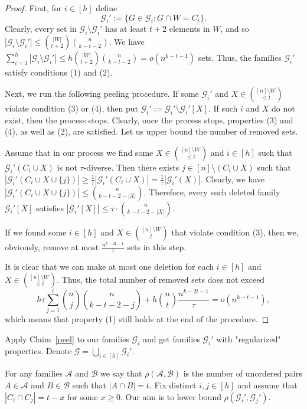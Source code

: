 \documentclass[12pt,a4paper]{article}
\newcommand{\cG}{\mathcal{G}}
\newcommand{\cA}{\mathcal{A}}
\newcommand{\bb}{\mathcal{B}}
\begin{document}
\begin{proof}
First, for $i \in [h]$ define
$$\mathcal{G}_i' := \{G \in \mathcal{G}_i: G \cap W = C_i\}.$$
Clearly, every set in $\mathcal{G}_i \setminus \mathcal{G}_i'$ has at least $t+2$ elements in $W$, and so $|\cG_i \setminus \cG_i'| \leqslant  \binom{|W|}{t+2}\binom{n}{k-t-2}.$ We have $ \sum_{i=1}^h   |\cG_i \setminus \cG_i'| \leqslant   h\binom{|W|}{t+2}\binom{n}{k-t-2}=o(n^{k-t-1})$ sets. Thus, the families $\mathcal{G}_i'$ satisfy conditions (1) and (2). 

Next, we run the following peeling procedure. If some $\cG_i'$ and $X \in \binom{[n] \setminus W}{\leq t}$ violate condition (3) or (4), then put $\cG_i' := \cG_i' \setminus \cG_i'[X]$. If such $i$ and $X$ do not exist, then the process stops. Clearly, once the process stops, properties (3) and (4), as well as (2), are satisfied. Let us upper bound the number of removed sets.

Assume that in our process we find some $X \in \binom{[n] \setminus W}{\leq t}$ and $i \in [h]$ such that $\mathcal{G}_i'(C_i \cup X)$ is not $\tau$-diverse. Then there exists $j \in [n] \setminus (C_i \cup X)$ such that $|\mathcal{G}_i'(C_i \cup X \cup \{j\})| \geqslant \frac{1}{\tau} |\mathcal{G}_i'(C_i \cup X)| = \frac{1}{\tau} |\mathcal{G}_i'(X)|.$ Clearly, we have $|\mathcal{G}_i'(C_i \cup X \cup \{j\})| \leqslant \binom{n}{k-t-2-|X|}$. Therefore, every such deleted family $\mathcal{G}_i'[X]$ satisfies $|\mathcal{G}_i'[X]|\leqslant \tau \cdot \binom{n}{k-t-2-|X|}$.

If we found some $i \in [h]$ and $X \in \binom{[n] \setminus W}{t}$ that violate condition (3), then we, obviously, remove at most $\frac{n^{k-2t-1}}{\tau}$ sets in this step.

It is clear that we can make at most one deletion for each $i \in [h]$ and $X \in \binom{[n] \setminus W}{\leq t}$. Thus, the total number of removed sets does not exceed 
$$h\tau \sum_{j=1}^t \binom{n}{j}\binom{n}{k-t-2-j} + h\binom{n}{t}\frac{n^{k-2t-1}}{\tau}  = o(n^{k-t-1}),$$
which means that property (1) still holds at the end of the procedure.
\end{proof}

Apply Claim~\ref{peel} to our families $\mathcal{G}_i$ and get families $\mathcal{G}_i'$ with "regularized" properties. Denote $\mathcal{G} = \bigcup_{i \in [h]} \mathcal{G}_i'.$

For any families $\cA$ and $\bb$ we say that $\rho(\cA,\bb)$ is the number of unordered pairs $A \in \cA$ and $B \in \bb$ such that $|A \cap B|=t$. Fix distinct $i, j \in [h]$ and assume that $|C_i \cap C_j| = t-x$ for some $x \geqslant 0$. Our aim is to lower bound $\rho(\cG_i', \cG_j')$.
\end{document}
